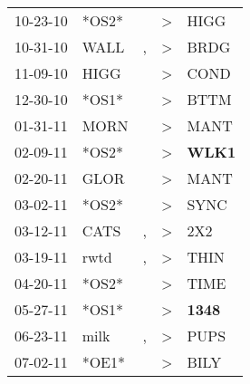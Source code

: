 \begin{supertabular}{p{0.07\textwidth}p{0.06\textwidth}p{0.02\textwidth}p{0.02\textwidth}p{0.06\textwidth}}
          10-23-10\textsuperscript{} &                            *OS2* &                  &     \textgreater &           HIGG\textsuperscript{} \\
          10-31-10\textsuperscript{} &           WALL\textsuperscript{} &                , &     \textgreater &           BRDG\textsuperscript{} \\
          11-09-10\textsuperscript{} &           HIGG\textsuperscript{} &                  &     \textgreater &           COND\textsuperscript{} \\
          12-30-10\textsuperscript{} &                            *OS1* &                  &     \textgreater &           BTTM\textsuperscript{} \\
          01-31-11\textsuperscript{} &           MORN\textsuperscript{} &                  &     \textgreater &           MANT\textsuperscript{} \\
          02-09-11\textsuperscript{} &                            *OS2* &                  &     \textgreater &  \textbf{WLK1\textsuperscript{}} \\
          02-20-11\textsuperscript{} &           GLOR\textsuperscript{} &                  &     \textgreater &           MANT\textsuperscript{} \\
          03-02-11\textsuperscript{} &                            *OS2* &                  &     \textgreater &           SYNC\textsuperscript{} \\
          03-12-11\textsuperscript{} &           CATS\textsuperscript{} &                , &     \textgreater &            2X2\textsuperscript{} \\
          03-19-11\textsuperscript{} &           rwtd\textsuperscript{} &                , &     \textgreater &           THIN\textsuperscript{} \\
          04-20-11\textsuperscript{} &                            *OS2* &                  &     \textgreater &           TIME\textsuperscript{} \\
          05-27-11\textsuperscript{} &                            *OS1* &                  &     \textgreater &  \textbf{1348\textsuperscript{}} \\
          06-23-11\textsuperscript{} &           milk\textsuperscript{} &                , &     \textgreater &           PUPS\textsuperscript{} \\
          07-02-11\textsuperscript{} &                            *OE1* &                  &     \textgreater &           BILY\textsuperscript{} \\

\end{supertabular}
